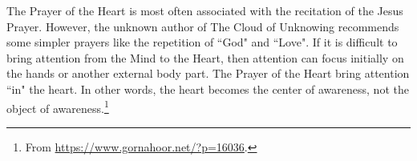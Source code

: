 The Prayer of the Heart is most often associated with the recitation of the Jesus Prayer. However, the unknown author of The Cloud of Unknowing recommends some simpler prayers like the repetition of ``God" and ``Love". If it is difficult to bring attention from the Mind to the Heart, then attention can focus initially on the hands or another external body part. The Prayer of the Heart bring attention ``in" the heart. In other words, the heart becomes the center of awareness, not the object of awareness.\footnote{From \url{https://www.gornahoor.net/?p=16036}.}